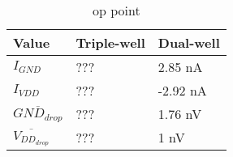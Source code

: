 
\begin{table}[H]
	\centering
	\begin{tabularx}{\columnwidth}{XXX}
		Value  & Triple-well & Dual-well \\ \hline
		$I_{GND}$                                 & ???          & 2.85 nA      \\
		$I_{VDD}$                                  & ???         & -2.92 nA       \\
		$\overline{GND_{drop}}$      & ???         & 1.76 nV      \\
		$\overline{V_{DD_{drop}}}$  & ???         & 1 nV
	\end{tabularx}
	\caption{op point}
	\label{tab_op}
\end{table}
